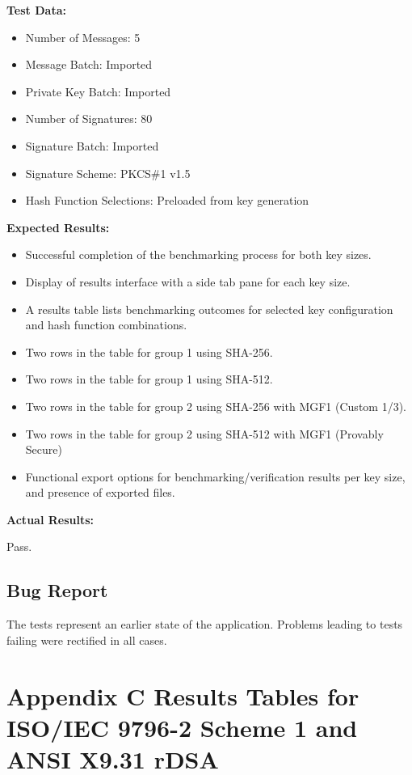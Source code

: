 \documentclass[]{final_report}
\theoremstyle{definition}
\begin{document}
\textbf{Test Data:}
\begin{itemize}
    \item Number of Messages: 5
    \item Message Batch: Imported
    \item Private Key Batch: Imported
     \item Number of Signatures: 80
     \item Signature Batch: Imported
    \item Signature Scheme: PKCS\#1 v1.5
     \item Hash Function Selections: Preloaded from key generation
\end{itemize}

\textbf{Expected Results:}
\begin{itemize}
    \item Successful completion of the benchmarking process for both key sizes.
    \item Display of results interface with a side tab pane for each key size.
    \item A results table lists benchmarking outcomes for selected key configuration and hash function combinations.
    \item Two rows in the table for group 1 using SHA-256.
    \item Two rows in the table for group 1 using SHA-512.
    \item Two rows in the table for group 2 using SHA-256 with MGF1 (Custom 1/3).
    \item Two rows in the table for group 2 using SHA-512 with MGF1 (Provably Secure)
    \item Functional export options for benchmarking/verification results per key size, and presence of exported files.
\end{itemize}

\textbf{Actual Results:} 

Pass.



\section*{Bug Report}
 
 The tests represent an earlier state of the application. Problems leading to tests failing were rectified in all cases.
 
 
 \chapter{Appendix C Results Tables for ISO/IEC 9796-2 Scheme 1 and ANSI X9.31 rDSA}
\end{document}
